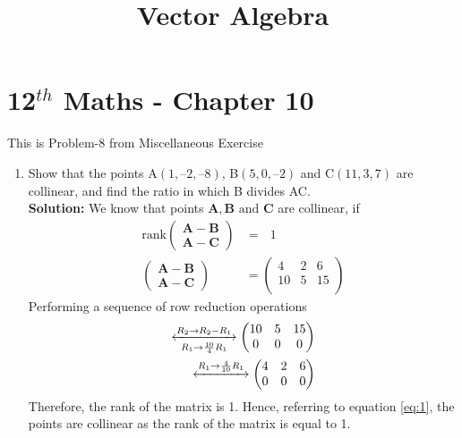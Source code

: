 \documentclass[12pt]{article}
\newcommand{\solution}{\noindent \textbf{Solution: }}
\newcommand{\myvec}[1]{\ensuremath{\begin{pmatrix}#1\end{pmatrix}}}
\let\vec\mathbf
\begin{document}
\begin{center}
\title{\textbf{Vector Algebra}}
\date{\vspace{-5ex}} %
\maketitle
\end{center}
\setcounter{page}{1}

\section{12$^{th}$ Maths - Chapter 10}
This is Problem-8 from Miscellaneous Exercise
\begin{enumerate}
\item Show that the points A$(1, – 2, – 8)$, B$(5, 0, – 2)$ and C$(11, 3, 7)$ are collinear, and
find the ratio in which B divides AC.\\
\solution 
 We know that points $\vec{A}, \vec{B} \text{ and } \vec{C}$ are collinear, if
\begin{align}
  \label{eq:1}
\text{rank}\myvec{ 
	\vec{A-B} \\ \vec{A-C}
}    &= \text{ } 1 \\   
\myvec{ 
\vec{A-B} \\
\vec{A-C}
}    &=   		\myvec{
        		4 & 2 & 6\\
        		10 & 5 & 15 \\
}
\end{align}
Performing a sequence of row reduction operations \\
\begin{align}
\xleftrightarrow[{R_1\rightarrow \frac{10}{4}R_1}]{{R_2\rightarrow R_2-R_1}}  \myvec{
  10 & 5 & 15 \\
  0 & 0 & 0 \\
}    \\
\xleftrightarrow[]{{R_1\rightarrow \frac{4}{10}R_1}}  \myvec{
  4 & 2 & 6\\
  0 & 0 & 0\\
}
\end{align}
Therefore, the rank of the matrix is 1. Hence, referring to equation \ref{eq:1}, the points are collinear as the rank of the matrix is equal to 1.\\ \\


\end{enumerate}
\end{document}
